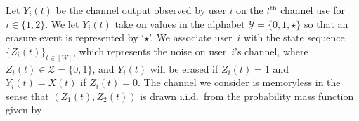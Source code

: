 
Let $Y_{i}(t)$ be the channel output observed by user $i$ on the $t^{\mathrm{th}}$ channel use for $i \in \{1, 2\}$. %
We let $Y_{i}(t)$ take on values in the alphabet $\mathcal{Y} = \{0, 1, \star\}$ so that an erasure event is represented by `$\star$'.   
%
We associate user~$i$ with the state sequence $\{Z_i(t)\}_{t \in [W]}$, which represents the noise on user~$i$'s channel, where $Z_i(t) \in \mathcal{Z} = \{0,1\}$,  and  $Y_i(t)$ will be erased if $Z_{i}(t) = 1$ and $Y_{i}(t) = X(t)$ if $Z_i(t) = 0$.  The channel we consider is memoryless in the sense that $(Z_{1}(t), Z_2(t))$ is drawn i.i.d.\ from the probability mass function given by   

